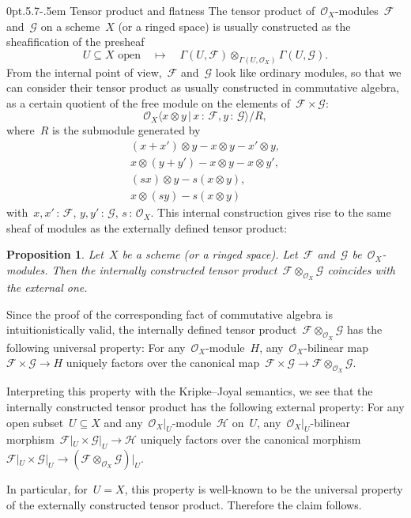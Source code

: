 \documentclass[10pt,reqno,a4paper]{amsbook}
\makeatletter
\theoremstyle{definition}
\theoremstyle{plain}
\newtheorem{prop}[defn]{Proposition}
\theoremstyle{remark}
\newcommand{\F}{\mathcal{F}}
\renewcommand{\G}{\mathcal{G}}
\renewcommand{\H}{\mathcal{H}}
\renewcommand{\O}{\mathcal{O}}
\newcommand{\?}{\,{:}\,}
\renewcommand{\_}{\mathpunct{.}\,}
\renewenvironment{proof}[1][\proofname]{\par
  \pushQED{\qed}%
  \normalfont \topsep6\p@\@plus6\p@\relax
  \trivlist
  \item[\hskip\labelsep
        \itshape
    #1\@addpunct{.}]\ignorespaces
}{%
  \popQED\endtrivlist\@endpefalse
}
\def\subsection{\@startsection{subsection}{2}%
  {0pt}{.5\linespacing\@plus.7\linespacing}{-.5em}%
  {\normalfont\bfseries}}
\makeatother
\begin{document}
\subsection{Tensor product and flatness} The tensor product
of~$\O_X$-modules~$\F$ and~$\G$ on a scheme~$X$ (or a ringed space) is usually
constructed as the sheafification of the presheaf
\[ \text{$U \subseteq X$ open} \quad\longmapsto\quad \Gamma(U,\F) \otimes_{\Gamma(U,\O_X)}
\Gamma(U,\G). \]
From the internal point of view,~$\F$ and~$\G$ look like ordinary modules, so
that we can consider their tensor product as usually constructed in
commutative algebra, as a certain quotient of the free module on the elements
of~$\F \times \G$:
\[ \O_X\langle x \otimes y \,|\, x\?\F, y\?\G \rangle / R, \]
where~$R$ is the submodule generated by
\begin{gather*}
  (x+x') \otimes y - x \otimes y - x' \otimes y, \\
  x \otimes (y+y') - x \otimes y - x \otimes y', \\
  (sx) \otimes y - s(x \otimes y), \\
  x \otimes (sy) - s(x \otimes y)
\end{gather*}
with~$x,x'\?\F$, $y,y'\?\G$, $s\?\O_X$.
This internal construction gives rise to the same sheaf
of modules as the externally defined tensor product:

\begin{prop}\label{prop:internal-tensor-product}
Let~$X$ be a scheme (or a ringed space). Let~$\F$ and~$\G$
be~$\O_X$-modules. Then the internally constructed tensor product~$\F
\otimes_{\O_X} \G$ coincides with the external one.
\end{prop}
\begin{proof}
Since the proof of the corresponding fact of commutative algebra is
intuitionistically valid, the internally defined tensor product~$\F \otimes_{\O_X} \G$
has the following universal property: For any~$\O_X$-module~$H$,
any~$\O_X$-bilinear map~$\F \times \G \to H$ uniquely factors over the
canonical map~$\F \times \G \to \F \otimes_{\O_X} \G$.

Interpreting this property with the Kripke--Joyal semantics, we see that the
internally constructed tensor product has the following external property:
For any open subset~$U \subseteq X$ and any~$\O_X|_U$-module~$\H$ on~$U$,
any~$\O_X|_U$-bilinear morphism~$\F|_U \times \G|_U \to \H$ uniquely factors over the
canonical morphism~$\F|_U \times \G|_U \to (\F \otimes_{\O_X} \G)|_U$.

In particular, for~$U = X$, this property is well-known to be the universal
property of the externally constructed tensor product. Therefore the
claim follows.
\end{proof}
\end{document}
